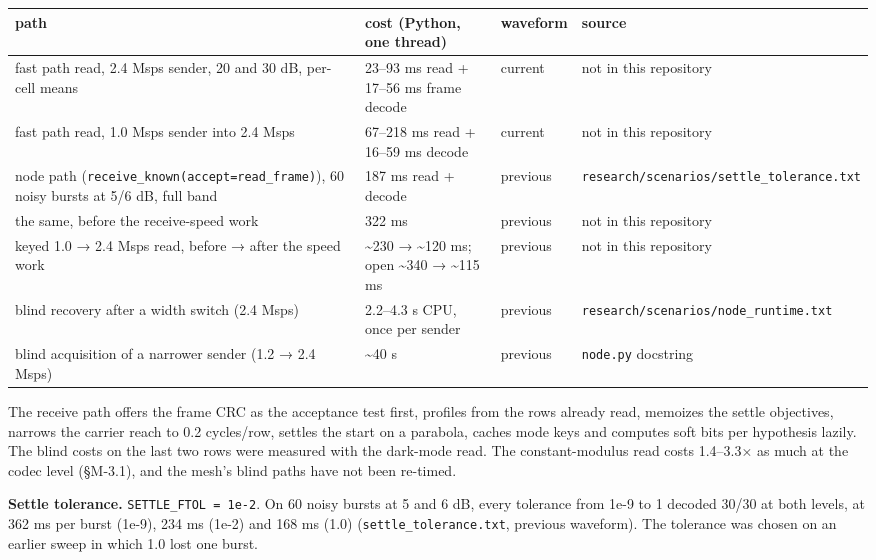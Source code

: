 \documentclass[10pt,letterpaper,twocolumn]{article}
\begin{document}
\begin{table}[tp]
\centering\footnotesize
\begin{tabular}{L{0.445\textwidth}L{0.186\textwidth}L{0.067\textwidth}L{0.236\textwidth}}
\toprule
path & cost (Python, one thread) & waveform & source \\
\midrule
fast path read, 2.4 Msps sender, 20 and 30 dB, per-cell means & 23--93 ms read + 17--56 ms frame decode & current & not in this repository \\
fast path read, 1.0 Msps sender into 2.4 Msps & 67--218 ms read + 16--59 ms decode & current & not in this repository \\
node path
(\texttt{receive\_\allowbreak{}known(\allowbreak{}accept=\allowbreak{}read\_\allowbreak{}frame)\allowbreak{}}),
60 noisy bursts at 5/6 dB, full band & 187 ms read + decode & previous & \texttt{research/\allowbreak{}scenarios/\allowbreak{}settle\_\allowbreak{}tolerance.\allowbreak{}txt} \\
the same, before the receive-speed work & 322 ms & previous & not in this repository \\
keyed 1.0 → 2.4 Msps read, before → after the speed work & \textasciitilde230 → \textasciitilde120 ms; open \textasciitilde340 →
\textasciitilde115 ms & previous & not in this repository \\
blind recovery after a width switch (2.4 Msps) & 2.2--4.3 s CPU, once per sender & previous & \texttt{research/\allowbreak{}scenarios/\allowbreak{}node\_\allowbreak{}runtime.\allowbreak{}txt} \\
blind acquisition of a narrower sender (1.2 → 2.4 Msps) & \textasciitilde40 s & previous & \texttt{node.\allowbreak{}py} docstring \\
\bottomrule
\end{tabular}
\end{table}

The receive path offers the frame CRC as the acceptance test first, profiles from the rows already read, memoizes the settle objectives, narrows the carrier reach to 0.2 cycles/row, settles the start on a parabola, caches mode keys and computes soft bits per hypothesis lazily. The blind costs on the last two rows were measured with the dark-mode read. The constant-modulus read costs 1.4--3.3× as much at the codec level (§M-3.1), and the mesh's blind paths have not been re-timed.

\textbf{Settle tolerance.} \texttt{SETTLE\_\allowbreak{}FTOL\ =\allowbreak{}\ 1e-{}\allowbreak{}2}. On 60 noisy bursts at 5 and 6 dB, every tolerance from 1e-9 to 1 decoded 30/30 at both levels, at 362 ms per burst (1e-9), 234 ms (1e-2) and 168 ms (1.0) (\texttt{settle\_\allowbreak{}tolerance.\allowbreak{}txt}, previous waveform). The tolerance was chosen on an earlier sweep in which 1.0 lost one burst.
\end{document}
